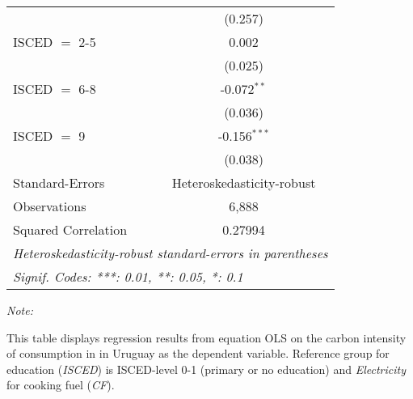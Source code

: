 \begin{table}[htbp!]
\begin{adjustbox}{width = 1\textwidth, max height = 0.95\textheight, center}
\begin{threeparttable}[b]
\begin{tabular}{lc}
                                & (0.257)\\   
            ISCED $=$ 2-5       & 0.002\\   
                                & (0.025)\\   
            ISCED $=$ 6-8       & -0.072$^{**}$\\   
                                & (0.036)\\   
            ISCED $=$ 9         & -0.156$^{***}$\\   
                                & (0.038)\\   
            \midrule 
            Standard-Errors     & Heteroskedasticity-robust \\   
            Observations        & 6,888\\  
            Squared Correlation & 0.27994\\  
            \midrule \midrule
            \multicolumn{2}{l}{\emph{Heteroskedasticity-robust standard-errors in parentheses}}\\
            \multicolumn{2}{l}{\emph{Signif. Codes: ***: 0.01, **: 0.05, *: 0.1}}\\
         \end{tabular}
         
         \begin{tablenotes}\item \medskip \textit{Note:}
            \item This table displays regression results from equation OLS on the carbon intensity of consumption in  in Uruguay as the dependent variable. Reference group for education (\textit{ISCED}) is ISCED-level 0-1 (primary or no education) and \textit{Electricity} for cooking fuel (\textit{CF}).
         \end{tablenotes}
      \end{threeparttable}
   \end{adjustbox}
\end{table}


